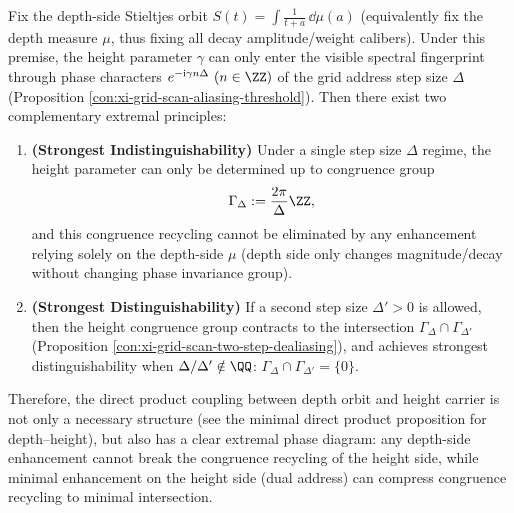 \begin{proposition}\label{prop:xi-depth-height-two-level-extremal}
Fix the depth-side Stieltjes orbit \(S(t)=\int\frac{1}{t+a}\,\dd\mu(a)\) (equivalently fix the depth measure \(\mu\), thus fixing all decay amplitude/weight calibers).
Under this premise, the height parameter \(\gamma\) can only enter the visible spectral fingerprint through phase characters \(e^{-\mathrm{i}\gamma n\Delta}\ (n\in\ZZ)\) of the grid address step size \(\Delta\) (Proposition \ref{con:xi-grid-scan-aliasing-threshold}).
Then there exist two complementary extremal principles:
\begin{enumerate}
  \item \textbf{(Strongest Indistinguishability)} Under a single step size \(\Delta\) regime, the height parameter can only be determined up to congruence group
  \[
  \Gamma_{\Delta}:=\frac{2\pi}{\Delta}\ZZ,
  \]
  and this congruence recycling cannot be eliminated by any enhancement relying solely on the depth-side \(\mu\) (depth side only changes magnitude/decay without changing phase invariance group).
  \item \textbf{(Strongest Distinguishability)} If a second step size \(\Delta'>0\) is allowed, then the height congruence group contracts to the intersection
  \(
  \Gamma_{\Delta}\cap\Gamma_{\Delta'}
  \)
  (Proposition \ref{con:xi-grid-scan-two-step-dealiasing}), and achieves strongest distinguishability when \(\Delta/\Delta'\notin\QQ\): \(\Gamma_{\Delta}\cap\Gamma_{\Delta'}=\{0\}\).
\end{enumerate}
Therefore, the direct product coupling between depth orbit and height carrier is not only a necessary structure (see the minimal direct product proposition for depth--height), but also has a clear extremal phase diagram: any depth-side enhancement cannot break the congruence recycling of the height side, while minimal enhancement on the height side (dual address) can compress congruence recycling to minimal intersection.
\end{proposition}

\endinput
